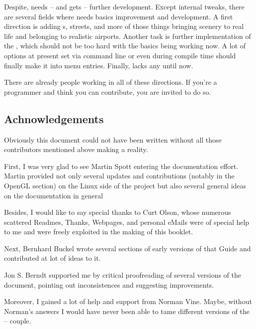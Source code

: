 Despite, \FlightGear{} needs -- and gets -- further development. Except internal tweaks,
there are several fields where \FlightGear{} needs basics improvement and development. A
first direction is adding s, streets, and more of those things bringing
scenery to real life and belonging to realistic airports. Another task is further
implementation of the , which should not be too hard with the basics
being working now. A lot of options at present set via command line or even during
compile time should finally make it into menu entries. Finally, \FlightGear{} lacks any
 until now. 

There are already people working in all of these directions. If you're a programmer and
think you can contribute, you are invited to do so.

\subsection*{Achnowledgements}
Obviously this document could not have been written without all those contributors
mentioned above making \FlightGear{} a reality.

First, I was very glad to see Martin Spott  entering the documentation effort. Martin provided not only several updates and contributions (notably in the OpenGL section) on the Linux side of the project but also several general ideas on the documentation in general

Besides, I would like to say special thanks to Curt Olson, whose
numerous scattered Readmes, Thanks, Webpages, and personal eMails were of special help to
me and were freely exploited in the making of this booklet.

Next, Bernhard Buckel  wrote several sections of early versions
of that Guide and contributed at lot of ideas to it.

Jon S. Berndt  supported me by critical proofreading of several
versions of the document, pointing out inconsistences and suggesting improvements.

Moreover, I gained a lot of help and support from Norman Vine. Maybe,
without Norman's answers I would have never been able to tame different versions of the
\Cygwin{} -- \FlightGear{} couple.

